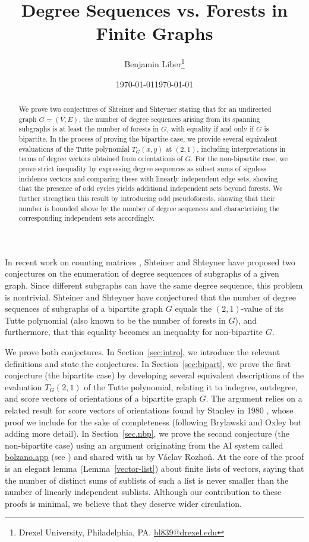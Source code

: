 \documentclass[12pt]{article}
\date{\monthyear\today}
\title{Degree Sequences vs. Forests in Finite Graphs}
\author{Benjamin Liber\footnote{Drexel University, Philadelphia, PA. \url{bl839@drexel.edu}}}
\date{\monthyear\today}
\theoremstyle{definition}
\theoremstyle{remark}
\renewcommand{\thefootnote}{\fnsymbol{footnote}}
\begin{document}
\maketitle

\begin{abstract}
    We prove two conjectures of Shteiner and Shteyner stating that for an undirected graph $G=(V,E)$, the number of degree sequences arising from its spanning subgraphs is at least the number of forests in $G$, with equality if and only if $G$ is bipartite. In the process of proving the bipartite case, we provide several equivalent evaluations of the Tutte polynomial $T_G(x,y)$ at $(2,1)$, including interpretations in terms of degree vectors obtained from orientations of $G$. For the non-bipartite case, we prove strict inequality by expressing degree sequences as subset sums of signless incidence vectors and comparing these with linearly independent edge sets, showing that the presence of odd cycles yields additional independent sets beyond forests. We further strengthen this result by introducing odd pseudoforests, showing that their number is bounded above by the number of degree sequences and characterizing the corresponding independent sets accordingly.
\end{abstract}

\renewcommand{\thefootnote}{\arabic{footnote}}

In recent work on counting matrices \cite{shteiner2025comparingnumberssubforestssubgraphdegreetuples}, Shteiner and Shteyner have proposed two conjectures on the enumeration of degree sequences of subgraphs of a given graph.
Since different subgraphs can have the same degree sequence, this problem is nontrivial.
Shteiner and Shteyner have conjectured that the number of degree sequences of subgraphs of a bipartite graph $G$ equals the $(2,1)$-value of its Tutte polynomial (also known to be the number of forests in $G$),
and furthermore, that this equality becomes an inequality for non-bipartite $G$.

We prove both conjectures. In Section~\ref{sec:intro}, we introduce the relevant definitions and state the conjectures. In Section~\ref{sec:bipart}, we prove the first conjecture (the bipartite case) by developing several equivalent descriptions of the evaluation $T_{G}(2,1)$ of the Tutte polynomial, relating it to indegree, outdegree, and score vectors of orientations of a bipartite graph $G$. The argument relies on a related result for score vectors of orientations found by Stanley in 1980 \cite{Stanley1980,BrylawskiOxley1992,KleitmanWinston}, whose proof we include for the sake of completeness (following Brylawski and Oxley \cite{BrylawskiOxley1992} but adding more detail). In Section~\ref{sec.nbp}, we prove the second conjecture (the non-bipartite case) using an argument originating from the AI system called \url{bolzano.app} (see \cite{Bolzano26}) and shared with us by V\'aclav Rozho\v{n}.
At the core of the proof is an elegant lemma (Lemma~\ref{vector-list}) about finite lists of vectors, saying that the number of distinct sums of sublists of such a list is never smaller than the number of linearly independent sublists.
Although our contribution to these proofs is minimal, we believe that they deserve wider circulation.
\end{document}
